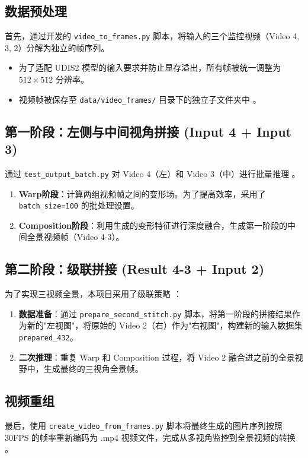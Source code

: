 \documentclass[a4paper,12pt]{article}
\begin{document}
\subsection{数据预处理}
首先，通过开发的 \texttt{video\_to\_frames.py} 脚本，将输入的三个监控视频（Video 4, 3, 2）分解为独立的帧序列。
\begin{itemize}
    \item 为了适配 UDIS2 模型的输入要求并防止显存溢出，所有帧被统一调整为 $512 \times 512$ 分辨率。
    \item 视频帧被保存至 \texttt{data/video\_frames/} 目录下的独立子文件夹中 。
\end{itemize}

\subsection{第一阶段：左侧与中间视角拼接 (Input 4 + Input 3)}
通过 \texttt{test\_output\_batch.py} 对 Video 4（左）和 Video 3（中）进行批量推理 。
\begin{enumerate}
    \item \textbf{Warp阶段}：计算两组视频帧之间的变形场。为了提高效率，采用了 \texttt{batch\_size=100} 的批处理设置。
    \item \textbf{Composition阶段}：利用生成的变形特征进行深度融合，生成第一阶段的中间全景视频帧（Video 4-3）。
\end{enumerate}

\subsection{第二阶段：级联拼接 (Result 4-3 + Input 2)}
为了实现三视频全景，本项目采用了级联策略 ：
\begin{enumerate}
    \item \textbf{数据准备}：通过 \texttt{prepare\_second\_stitch.py} 脚本，将第一阶段的拼接结果作为新的"左视图"，将原始的 Video 2（右）作为"右视图"，构建新的输入数据集 \texttt{prepared\_432}。
    \item \textbf{二次推理}：重复 Warp 和 Composition 过程，将 Video 2 融合进之前的全景视野中，生成最终的三视角全景帧。
\end{enumerate}

\subsection{视频重组}
最后，使用 \texttt{create\_video\_from\_frames.py} 脚本将最终生成的图片序列按照 30FPS 的帧率重新编码为 .mp4 视频文件，完成从多视角监控到全景视频的转换 。
\end{document}
